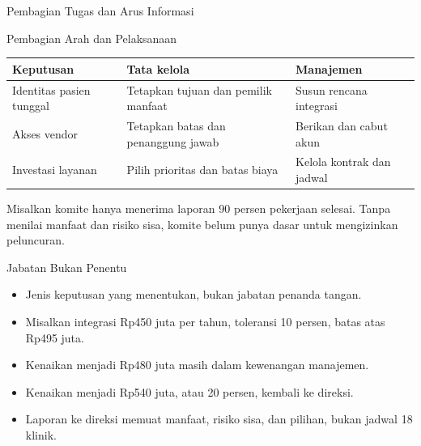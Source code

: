 \documentclass[aspectratio=169, table, 12pt]{beamer}
\begin{document}
\begin{frame}{{\Large Pembagian Tugas dan Arus Informasi}}
  \centering
  \resizebox{!}{0.74\textheight}{}
\end{frame}

\begin{frame}{{\Large Pembagian Arah dan Pelaksanaan}}
  \vspace{4pt}
  \footnotesize
  \begin{tabularx}{\textwidth}{|>{\raggedright\arraybackslash}p{}|>{\raggedright\arraybackslash}X|>{\raggedright\arraybackslash}X|}
    \hline
    \textbf{Keputusan} & \textbf{Tata kelola} & \textbf{Manajemen} \\ \hline
    Identitas pasien tunggal & Tetapkan tujuan dan pemilik manfaat & Susun rencana integrasi \\ \hline
    Akses vendor & Tetapkan batas dan penanggung jawab & Berikan dan cabut akun \\ \hline
    Investasi layanan & Pilih prioritas dan batas biaya & Kelola kontrak dan jadwal \\ \hline
  \end{tabularx}

  \vspace{8pt}
  \small Misalkan komite hanya menerima laporan 90 persen pekerjaan selesai. Tanpa menilai manfaat
  dan risiko sisa, komite belum punya dasar untuk mengizinkan peluncuran.
\end{frame}

\begin{frame}{{\Large Jabatan Bukan Penentu}}
  \vspace{6pt}
  \small
  \begin{itemize}
    \item Jenis keputusan yang menentukan, bukan jabatan penanda tangan.
    \item Misalkan integrasi Rp450 juta per tahun, toleransi 10 persen, batas atas Rp495 juta.
    \item Kenaikan menjadi Rp480 juta masih dalam kewenangan manajemen.
    \item Kenaikan menjadi Rp540 juta, atau 20 persen, kembali ke direksi.
    \item Laporan ke direksi memuat manfaat, risiko sisa, dan pilihan, bukan jadwal 18 klinik.
  \end{itemize}
\end{frame}
\end{document}
